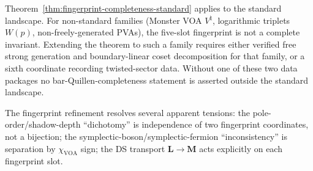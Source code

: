 \begin{remark}
\label{rem:fingerprint-nonstandard-open}
Theorem~\ref{thm:fingerprint-completeness-standard} applies to the
standard landscape. For non-standard families (Monster VOA
$V^\natural$, logarithmic triplets $W(p)$, non-freely-generated PVAs),
the five-slot fingerprint is not a complete invariant.  Extending the
theorem to such a family requires either verified free strong generation
and boundary-linear coset decomposition for that family, or a sixth
coordinate recording twisted-sector data.  Without one of these two
data packages no bar-Quillen-completeness statement is asserted outside
the standard landscape.
\end{remark}

The fingerprint refinement resolves several apparent tensions: the pole-order/shadow-depth ``dichotomy'' is independence of two fingerprint coordinates, not a bijection; the symplectic-boson/symplectic-fermion ``inconsistency'' is separation by $\chi_{\mathrm{VOA}}$ sign; the DS transport $\mathbf{L} \to \mathbf{M}$ acts explicitly on each fingerprint slot.

